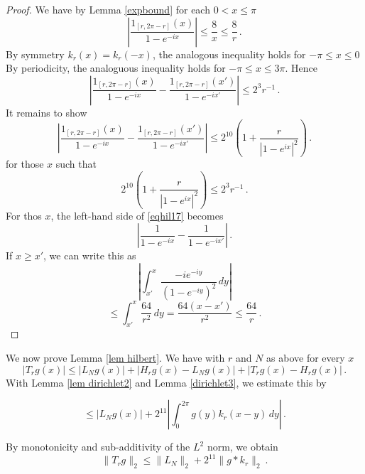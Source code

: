 \begin{proof}
We have by Lemma \ref{expbound} for each $0<x\le \pi$
\begin{equation}
    |\frac{1_{[r, 2\pi -r]}(x)}{1-e^{-ix}}|\le \frac 8x\le \frac 8r\, .
\end{equation}
By symmetry $k_r(x)=k_r(-x)$, the analogous inequality holds for $-\pi \le x\le 0$
By periodicity, the analoguous inequality holds for $-\pi\le x\le 3\pi$.
Hence
\begin{equation}\label{eqhil16}
    |\frac{1_{[r, 2\pi -r]}(x)}{1-e^{-ix}}-\frac{1_{[r, 2\pi -r]}(x')}{1-e^{-ix'}}|\le 2^{3}r^{-1}\, .
\end{equation}
It remains to show
\begin{equation}\label{eqhil17}
    |\frac{1_{[r, 2\pi -r]}(x)}{1-e^{-ix}}-\frac{1_{[r, 2\pi -r]}(x')}{1-e^{-ix'}}|\le 2^{10}\left(1+\frac{r}{|1-e^{ix}|^2}\right)\, .
\end{equation}
for those $x$ such that
\begin{equation}\label{eqhil15}
    2^{10}\left(1+\frac{r}{|1-e^{ix}|^2}\right)\le 2^{3}r^{-1}\, .
\end{equation}
    For thos $x$, the left-hand side  of \eqref{eqhil17} becomes
    \begin{equation}
    |\frac{1}{1-e^{-ix}}-\frac{1}{1-e^{-ix'}}|\, .
\end{equation}
If $x\ge x'$, we can write this as
\begin{equation*}
    |\int_{x'}^x \frac{-ie^{-iy}}{(1-e^{-iy})^2}\, dy|
\end{equation*}
\begin{equation}
    \le \int_{x'}^x \frac{64}{r^2}\, dy=\frac{64(x-x')}{r^2}\le \frac{64}r\, .
\end{equation}


\end{proof}

We now prove Lemma \ref{lem hilbert}.
We have with $r$ and $N$ as above for every $x$
\begin{equation}
|T_rg(x)|\le |L_Ng(x)|+ |H_rg(x)-L_Ng(x)|+ |T_rg(x)-H_rg(x)|\, .
\end{equation}
With Lemma \ref{lem dirichlet2} and Lemma \ref{dirichlet3}, we estimate this by

\begin{equation}
\le |L_Ng(x)|+ 2^{11}|\int_0^{2\pi} g(y) k_r(x-y)\, dy|\, .
\end{equation}

By monotonicity and sub-additivity of the $L^2$ norm, we obtain
\begin{equation}
    \|T_rg\|_2\le \|L_N\|_2+2^{11}\|g*k_r\|_2\ .
\end{equation}

